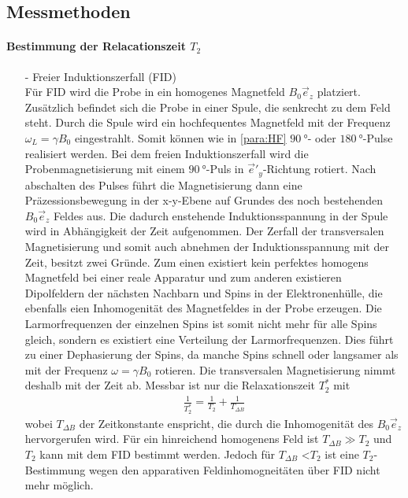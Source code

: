 \subsection{Messmethoden}
\paragraph{Bestimmung der Relacationszeit $T_2$}
\begin{itemize}
  \item[-] Freier Induktionszerfall (FID)\\
  Für FID wird die Probe
  in ein homogenes Magnetfeld $B_0\vec{e}_z$ platziert.
  Zusätzlich befindet sich die Probe in einer
  Spule, die senkrecht zu dem Feld steht.
  Durch die Spule wird ein hochfequentes Magnetfeld
  mit der Frequenz $\omega_L=\gamma B_0$ eingestrahlt.
  Somit können wie in \ref{para:HF} $\SI{90}{\degree}$- oder $\SI{180}{\degree}$-Pulse
realisiert werden.
Bei dem freien Induktionszerfall wird die Probenmagnetisierung mit einem
$\SI{90}{\degree}$-Puls in $\vec{e}'_y$-Richtung rotiert. Nach abschalten des Pulses
führt die Magnetisierung dann eine Präzessionsbewegung in der
x-y-Ebene auf Grundes des noch bestehenden $B_0\vec{e}_z$ Feldes aus.
Die dadurch enstehende Induktionsspannung in der Spule wird in Abhängigkeit der Zeit aufgenommen.
Der Zerfall der transversalen Magnetisierung und somit auch abnehmen der
Induktionsspannung mit der Zeit, besitzt zwei Gründe.
Zum einen existiert kein perfektes homogens Magnetfeld bei einer
reale Apparatur und zum anderen
existieren Dipolfeldern der nächsten Nachbarn und Spins in der Elektronenhülle,
die ebenfalls eien Inhomogenität des Magnetfeldes in der Probe erzeugen.
Die Larmorfrequenzen der einzelnen Spins ist somit nicht mehr für alle Spins
gleich, sondern es existiert eine Verteilung der Larmorfrequenzen.
Dies führt zu einer Dephasierung
der Spins, da manche Spins schnell oder langsamer
als mit der Frequenz $\omega=\gamma B_0$ rotieren.
Die transversalen Magnetisierung nimmt deshalb mit der Zeit ab.
Messbar ist nur die Relaxationszeit $T_2^*$
mit
\begin{align}
  \frac{1}{T_2^*} = \frac{1}{T_2} + \frac{1}{T_{\Delta B}}
\end{align}
wobei $T_{\Delta B}$ der Zeitkonstante enspricht, die durch die Inhomogenität
des $B_0\vec{e}_z$ hervorgerufen wird.
Für ein hinreichend homogenens Feld ist $T_{\Delta B} \gg T_2$
und $T_2$ kann mit dem FID bestimmt werden.
Jedoch für $T_{\Delta B}$ \textless $T_2$ ist eine $T_2$-Bestimmung wegen
den apparativen Feldinhomogneitäten über FID nicht mehr möglich.


\end{itemize}
